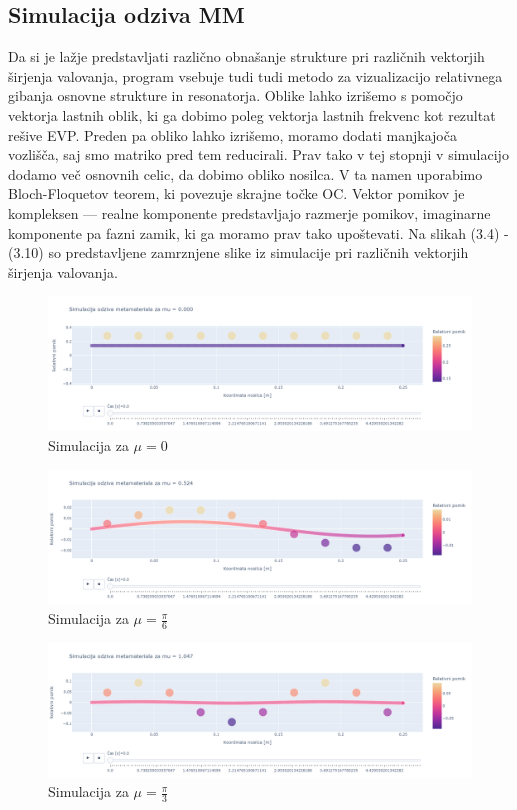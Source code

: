 \documentclass[12pt]{report}
\begin{document}
\subsection{Simulacija odziva \ac{MM}}
Da si je lažje predstavljati različno obnašanje strukture pri različnih vektorjih širjenja valovanja, program vsebuje tudi tudi metodo za vizualizacijo relativnega gibanja osnovne strukture
in resonatorja. Oblike lahko izrišemo s pomočjo vektorja lastnih oblik, ki ga dobimo poleg vektorja lastnih frekvenc kot rezultat rešive \ac{EVP}. Preden pa obliko lahko izrišemo, moramo dodati manjkajoča
vozlišča, saj smo matriko pred tem reducirali. Prav tako v tej stopnji v simulacijo dodamo več osnovnih celic, da dobimo obliko nosilca. V ta namen uporabimo Bloch-Floquetov teorem, ki povezuje skrajne točke \ac{OC}.
Vektor pomikov je kompleksen --- realne komponente predstavljajo razmerje pomikov, imaginarne komponente pa fazni zamik, ki ga moramo prav tako upoštevati. Na slikah (3.4) - (3.10) so predstavljene zamrznjene slike iz simulacije pri 
različnih vektorjih širjenja valovanja. 
\begin{figure}[H]
  \centering
  \includegraphics[trim={0 4cm 0 3.5cm},clip, scale=0.3]{Images/mu0.png}
  \caption{Simulacija za $\mu = 0$}
\end{figure}
\begin{figure}[H]
  \centering
  \includegraphics[trim={0 4cm 0 3.5cm},clip, scale=0.3]{Images/mupi_6.png}
  \caption{Simulacija za $\mu = \frac{\pi}{6}$}
\end{figure}
\begin{figure}[H]
  \centering
  \includegraphics[trim={0 4cm 0 3.5cm},clip, scale=0.3]{Images/mupi_3.png}
  \caption{Simulacija za $\mu = \frac{\pi}{3}$}
\end{figure}
\end{document}
